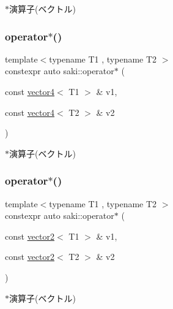 $\ast$演算子(ベクトル) 

\mbox{\label{namespacesaki_a19656e376d8720e2a67f3d08082770b0}} 
\subsubsection{\texorpdfstring{operator$\ast$()}{operator*()}\hspace{0.1cm}{\footnotesize\ttfamily [10/14]}}
{\footnotesize\ttfamily template$<$typename T1 , typename T2 $>$ \\
constexpr auto saki\+::operator$\ast$ (\begin{DoxyParamCaption}\item[{const \mbox{\hyperlink{classsaki_1_1vector4}{vector4}}$<$ T1 $>$ \&}]{v1,  }\item[{const \mbox{\hyperlink{classsaki_1_1vector4}{vector4}}$<$ T2 $>$ \&}]{v2 }\end{DoxyParamCaption})}



$\ast$演算子(ベクトル) 

\mbox{\label{namespacesaki_a1db47b2e2e0826325ae66ee6216ba5fc}} 
\subsubsection{\texorpdfstring{operator$\ast$()}{operator*()}\hspace{0.1cm}{\footnotesize\ttfamily [11/14]}}
{\footnotesize\ttfamily template$<$typename T1 , typename T2 $>$ \\
constexpr auto saki\+::operator$\ast$ (\begin{DoxyParamCaption}\item[{const \mbox{\hyperlink{classsaki_1_1vector2}{vector2}}$<$ T1 $>$ \&}]{v1,  }\item[{const \mbox{\hyperlink{classsaki_1_1vector2}{vector2}}$<$ T2 $>$ \&}]{v2 }\end{DoxyParamCaption})}



$\ast$演算子(ベクトル) 

\mbox{\label{namespacesaki_a8ec94b07795582554759e6f844b6055f}} 
